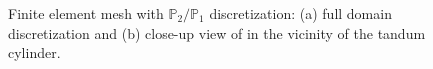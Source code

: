 \begin{figure}
\centering 
\begin{subfigure}{0.495\textwidth}
\centering
    \caption{}
    \label{•}
    \end{subfigure}  
\begin{subfigure}{0.495\textwidth}
\centering
    \caption{}
    \label{•}
    \end{subfigure} 
  \caption{Finite element mesh with $\mathbb{P}_{2}/\mathbb{P}_{1}$ discretization: (a) full domain
discretization and (b) close-up view of in the vicinity of the
tandum cylinder. }
\label{fig:mesh}  
\end{figure}

